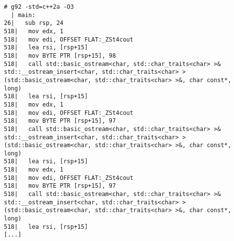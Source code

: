 \begin{lstlisting}[language={},numbers=none,title=\href{https://godbolt.org/z/lJs9Vd}{\texttt{godbolt.org/z/lJs9Vd}}]
# g92 -std=c++2a -O3
  | main:
26|   sub rsp, 24
518|   mov edx, 1
518|   mov edi, OFFSET FLAT:_ZSt4cout
518|   lea rsi, [rsp+15]
518|   mov BYTE PTR [rsp+15], 98
518|   call std::basic_ostream<char, std::char_traits<char> >& std::__ostream_insert<char, std::char_traits<char> >(std::basic_ostream<char, std::char_traits<char> >&, char const*, long)
518|   lea rsi, [rsp+15]
518|   mov edx, 1
518|   mov edi, OFFSET FLAT:_ZSt4cout
518|   mov BYTE PTR [rsp+15], 97
518|   call std::basic_ostream<char, std::char_traits<char> >& std::__ostream_insert<char, std::char_traits<char> >(std::basic_ostream<char, std::char_traits<char> >&, char const*, long)
518|   lea rsi, [rsp+15]
518|   mov edx, 1
518|   mov edi, OFFSET FLAT:_ZSt4cout
518|   mov BYTE PTR [rsp+15], 97
518|   call std::basic_ostream<char, std::char_traits<char> >& std::__ostream_insert<char, std::char_traits<char> >(std::basic_ostream<char, std::char_traits<char> >&, char const*, long)
518|   lea rsi, [rsp+15]
[...]
\end{lstlisting}
